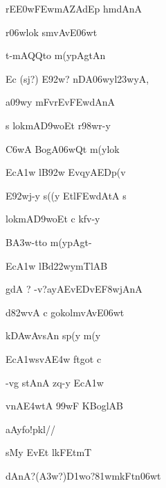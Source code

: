 \ujvers\dnnemsloka 
{\dn rE\3E0w\3FEwmAZAdEp h\?mdAnA}
\dontdisplaylinenum

\dnnemslokab 
{\dn {}r\?\306wlok\2 smvAvE\306wt \dandadn\dontdisplaylinenum}

\dnnemslokac 
{\dn t-mAQQto m(y\0pAgtAn\2}
\dontdisplaylinenum

\dnnemslokad 
{\dn Ec {\rs (\re}sj{\rs ?)\re} E\392w{\rs ?\re} nDA\306wyl\323wyA, \vegdn\dontdisplaylinenum}


\ujvers\dnnemsloka 
{\dn a\309wy mFvrEv\3FEwdAnA}
\dontdisplaylinenum

\dnnemslokab 
{\dn s lokmA\3D9woEt r\?\398wr-y \dandadn\dontdisplaylinenum}

\dnnemslokac 
{\dn {}\3C6wA  BogA\306wQt m(y\0lok\?}
\dontdisplaylinenum

\dnnemslokad 
{\dn Ec\3A1w\2 lB\?\392w\4 EvqyAEDp(v \vegdn\dontdisplaylinenum}


\ujvers\dnnemsloka 
{\dn E\392wj-y s((y Etl\3FEwdAtA s}
\dontdisplaylinenum

\dnnemslokab 
{\dn lokmA\3D9woEt c k\?fv-y \dandadn\dontdisplaylinenum}

\dnnemslokac 
{\dn B\5\3A3w-tto m(y\0pAgt-}
\dontdisplaylinenum

\dnnemslokad 
{\dn Ec\3A1w\2 lB\?d\322wymT\0lAB \vegdn\dontdisplaylinenum}


\ujvers\dnnemsloka 
{\dn gdA {\rs ?\re} -v{\rs ?\re}ayA\2EvEDvE\3F8wjAnA}
\dontdisplaylinenum

\dnnemslokab 
{\dn d\382wvA c gokolmvAvE\306wt \dandadn\dontdisplaylinenum}

\dnnemslokac 
{\dn k\3DAwAvsAn\? sp\?(y m(y\?{\qvb}}
\dontdisplaylinenum

\dnnemslokad 
{\dn Ec\3A1wsvA\3E4w\2 ftgot\2 c \vegdn\dontdisplaylinenum}


\ujvers\dnnemsloka 
{\dn -vg{\rdt} stAnA\2 zq-y Ec\3A1w\2}
\dontdisplaylinenum

\dnnemslokab 
{\dn vnA\3E4wtA \399wF KBoglAB \dandadn\dontdisplaylinenum}

\dnnemslokac 
{\dn aAy\0fo!pkl//}
\dontdisplaylinenum

\dnnemslokad 
{\dn sMy EvEt lkFEt\0mT\0 \vegdn\dontdisplaylinenum}


\ujvers\dnnemsloka 
{\dn dAnA{\rs ?(\re}\3A3w{\rs ?)\re}\3D1wo{\rs ?\re}\381wmkFt\0n\306wt\?}
\dontdisplaylinenum

